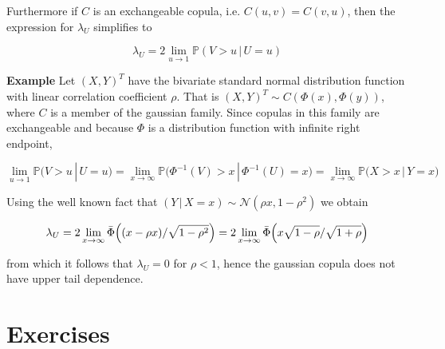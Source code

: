 \documentclass{article}
\begin{document}
Furthermore if $C$ is an exchangeable copula, i.e. $C(u,v) = C(v,u)$, then the expression for $\lambda_U$ simplifies to

\begin{equation}
\lambda_U =  2 \lim\limits_{u\rightarrow 1} \mathbb{P} (V > u\, |\, U = u)
\end{equation}

\noindent\textbf{Example} Let $(X, Y)^T$ have the bivariate standard normal distribution function with linear correlation coefficient $\rho$. That is $(X, Y)^T \sim C(\Phi(x), \Phi(y))$, where $C$ is a member of the gaussian family. Since copulas in this family are exchangeable and because $\Phi$ is a distribution function with infinite right endpoint,

\begin{equation}
    \lim\limits_{u\rightarrow 1}       \mathbb{P}\bigl(V > u\, |\, U = u \bigr)
=  \lim\limits_{x\rightarrow \infty} \mathbb{P}\bigl(\Phi^{-1}(V)>x\, |\,\Phi^{-1} (U) = x \bigr)
= \lim\limits_{x\rightarrow \infty} \mathbb{P}\bigl(X>x\, |\,Y = x \bigr)
\end{equation}

Using the well known fact that $(Y \,\vert \, X = x) \sim \mathcal{N}(\rho x, 1-\rho^2)$ we obtain

\begin{equation}
\lambda_U = 2 \lim\limits_{x\rightarrow \infty}\bar \Phi \Bigl( (x -\rho x)/\sqrt{1-\rho^2} \Bigr) =
2 \lim\limits_{x\rightarrow \infty}\bar \Phi \Bigl( x \sqrt{1-\rho}/\sqrt{1+\rho} \Bigr)
\end{equation}

from which it follows that $\lambda_U = 0$ for $\rho < 1$, hence the gaussian copula does not have upper tail dependence.


%
%
\section{Exercises}
\end{document}

